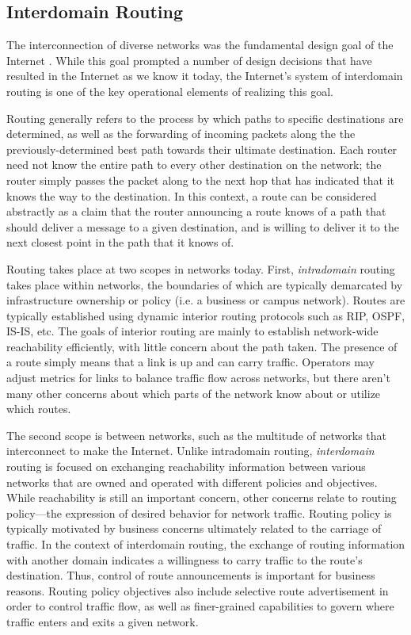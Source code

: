 \subsection{Interdomain Routing}

The interconnection of diverse networks was the fundamental design goal of the Internet \cite{Clark:1988kl}. While this goal prompted a number of design decisions that have resulted in the Internet as we know it today, the Internet's system of interdomain routing is one of the key operational elements of realizing this goal.

Routing generally refers to the process by which paths to specific destinations are determined, as well as the forwarding of incoming packets along the the previously-determined best path towards their ultimate destination. Each router need not know the entire path to every other destination on the network; the router simply passes the packet along to the next hop that has indicated that it knows the way to the destination. In this context, a route can be considered abstractly as a claim that the router announcing a route knows of a path that should deliver a message to a given destination, and is willing to deliver it to the next closest point in the path that it knows of.

Routing takes place at two scopes in networks today. First, \emph{intradomain} routing takes place within networks, the boundaries of which are typically demarcated by infrastructure ownership or policy (i.e. a business or campus network). Routes are typically established using dynamic interior routing protocols such as RIP, OSPF, IS-IS, etc. The goals of interior routing are mainly to establish network-wide reachability efficiently, with little concern about the path taken. The presence of a route simply means that a link is up and can carry traffic. Operators may adjust metrics for links to balance traffic flow across networks, but there aren't many other concerns about which parts of the network know about or utilize which routes.

The second scope is between networks, such as the multitude of networks that interconnect to make the Internet. Unlike intradomain routing, \emph{interdomain} routing is focused on exchanging reachability information between various networks that are owned and operated with different policies and objectives. While reachability is still an important concern, other concerns relate to routing policy---the expression of desired behavior for network traffic. Routing policy is typically motivated by business concerns ultimately related to the carriage of traffic. In the context of interdomain routing, the exchange of routing information with another domain indicates a willingness to carry traffic to the route's destination. Thus, control of route announcements is important for business reasons. Routing policy objectives also include selective route advertisement in order to control traffic flow, as well as finer-grained capabilities to govern where traffic enters and exits a given network.

